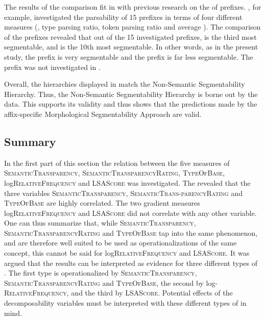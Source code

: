 The results of the  comparison fit in with previous research on the  of prefixes. \cite{Zirkel.2010}, for example, investigated the parsability of 15 prefixes in terms of four different measures (, type parsing ratio, token parsing ratio and average ). The comparison of the prefixes revealed that out of the 15 investigated prefixes,  is the third most segmentable, and  is the 10th most segmentable. In other words,\pagebreak{} as in the present study, the prefix  is very segmentable and the prefix  is far less segmentable. The prefix  was not investigated in \cite{Zirkel.2010}.

Overall, the  hierarchies displayed in  match the Non-Semantic Segmentability Hierarchy. Thus, the Non-Semantic Segmentability Hierarchy is borne out by the data. This supports its validity and thus shows that the predictions made by the affix-specific Morphological Segmentability Approach are valid.

\subsection{Summary } \label{summary decomposability corpus study}

In the first part of this section the relation between the five measures of  \textsc{SemanticTransparency}, \textsc{SemanticTransparencyRating}, \textsc{TypeOfBase}, log\textsc{RelativeFrequency} and \textsc{LSAScore} was investigated. The  revealed that the three variables \textsc{SemanticTransparency}, \textsc{SemanticTrans-parencyRating} and \textsc{TypeOfBase} are highly correlated. The two gradient measures  log\textsc{RelativeFrequency} and \textsc{LSAScore}  did not correlate with any other  variable.  
One can thus summarize that, while  \textsc{SemanticTransparency}, \textsc{SemanticTransparencyRating} and \textsc{TypeOfBase} tap into the same phenomenon, and are therefore well suited to be used as operationalizations of the same concept, this cannot be said for 
log\textsc{RelativeFrequency} and \textsc{LSAScore}. 
It was argued that the results can be interpreted as evidence for three different types of . The first type is operationalized by  \textsc{SemanticTransparency}, \textsc{SemanticTransparencyRating} and \textsc{TypeOfBase}, the second by log-\textsc{RelativeFrequency}, and the third by \textsc{LSAScore}. Potential effects of the decomposability variables must be interpreted with these different types of  in mind. 

